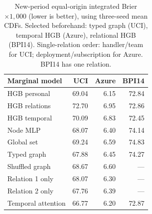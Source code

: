 \begin{table}[t]
\centering\small
\caption{New-period equal-origin integrated Brier $\times 1,000$ (lower is better), using three-seed mean CDFs. Selected beforehand: typed graph (UCI), temporal HGB (Azure), relational HGB (BPI14). Single-relation order: handler/team for UCI; deployment/subscription for Azure. BPI14 has one relation.}\label{tab:extension-marginals}
\begin{tabular}{lrrr}
\toprule
Marginal model & UCI & Azure & BPI14 \\
\midrule
HGB personal & 69.04 & 6.15 & 72.84 \\
HGB relations & 72.70 & 6.95 & 72.86 \\
HGB temporal & 70.09 & 6.83 & 72.45 \\
Node MLP & 68.07 & 6.40 & 74.14 \\
Global set & 69.24 & 6.59 & 74.83 \\
Typed graph & 67.88 & 6.45 & 74.27 \\
Shuffled graph & 68.67 & 6.60 & --- \\
Relation 1 only & 68.07 & 6.30 & --- \\
Relation 2 only & 67.76 & 6.39 & --- \\
Temporal attention & 66.77 & 6.20 & 72.87 \\
\bottomrule
\end{tabular}
\end{table}
